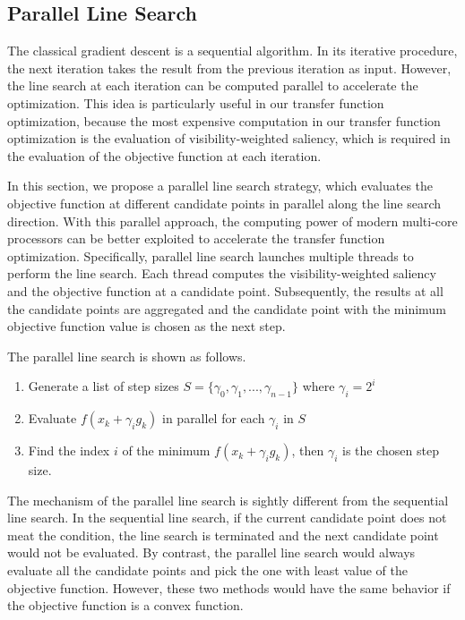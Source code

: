 \subsection{Parallel Line Search}
The classical gradient descent is a sequential algorithm. In its iterative procedure, the next iteration takes the result from the previous iteration as input.
However, the line search at each iteration can be computed parallel to accelerate the optimization. This idea is particularly useful in our transfer function optimization, because the most expensive computation in our transfer function optimization is the evaluation of visibility-weighted saliency, which is required in the evaluation of the objective function at each iteration.

In this section, we propose a parallel line search strategy, which evaluates the objective function at different candidate points in parallel along the line search direction. With this parallel approach, the computing power of modern multi-core processors can be better exploited to accelerate the transfer function optimization. Specifically, parallel line search launches multiple threads to perform the line search. Each thread computes the visibility-weighted saliency and the objective function at a candidate point. Subsequently, the results at all the candidate points are aggregated and the candidate point with the minimum objective function value is chosen as the next step.

The parallel line search is shown as follows.

\begin{enumerate}
	\item Generate a list of step sizes $ S= \{ \gamma_{0},\gamma_{1},...,\gamma_{n-1} \} $ where $ \gamma_{i}=2^{i} $
	\item Evaluate $ f(x_{k}+\gamma_{i} g_{k}) $ in parallel for each $ \gamma_{i} $ in $ S $
	\item Find the index $ i $ of the minimum $ f(x_{k}+\gamma_{i} g_{k}) $, then $ \gamma_{i} $ is the chosen step size.
\end{enumerate}

The mechanism of the parallel line search is sightly different from the sequential line search. In the sequential line search, if the current candidate point does not meat the condition, the line search is terminated and the next candidate point would not be evaluated. By contrast, the parallel line search would always evaluate all the candidate points and pick the one with least value of the objective function. However, these two methods would have the same behavior if the objective function is a convex function.

